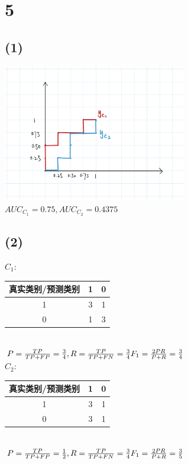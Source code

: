 \documentclass{article}
\begin{document}
\section*{5}
\subsection*{(1)}
\includegraphics[width=8cm,height=6cm]{roc.jpg}\\
$AUC_{C_1}=0.75,AUC_{C_2}=0.4375$
\subsection*{(2)}
$C_1:$
\begin{tabular}{|c|c|c|}\hline
真实类别/预测类别&1&0\\\hline
1&3&1\\\hline
0&1&3\\\hline
\end{tabular}\\
$P=\frac{TP}{TP+FP}=\frac{3}{4},R=\frac{TP}{TP+FN}=\frac{3}{4}\\
F_1=\frac{2PR}{P+R}=\frac{3}{4}$\\
$C_2:$
\begin{tabular}{|c|c|c|}\hline
	真实类别/预测类别&1&0\\\hline
	1&3&1\\\hline
	0&3&1\\\hline
\end{tabular}\\
$P=\frac{TP}{TP+FP}=\frac{1}{2},R=\frac{TP}{TP+FN}=\frac{3}{4}\\
F_1=\frac{2PR}{P+R}=\frac{3}{5}$
\end{document}
